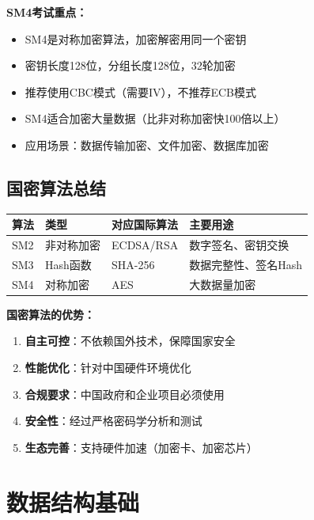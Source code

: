 ﻿\documentclass[12pt,a4paper]{article}
\begin{document}
\begin{keypointbox}
\textbf{SM4考试重点：}
\begin{itemize}
\item SM4是对称加密算法，加密解密用同一个密钥
\item 密钥长度128位，分组长度128位，32轮加密
\item 推荐使用CBC模式（需要IV），不推荐ECB模式
\item SM4适合加密大量数据（比非对称加密快100倍以上）
\item 应用场景：数据传输加密、文件加密、数据库加密
\end{itemize}
\end{keypointbox}

\subsection{国密算法总结}

\begin{center}
\begin{tabular}{|l|l|l|l|}
\hline
\textbf{算法} & \textbf{类型} & \textbf{对应国际算法} & \textbf{主要用途} \\
\hline
SM2 & 非对称加密 & ECDSA/RSA & 数字签名、密钥交换 \\
\hline
SM3 & Hash函数 & SHA-256 & 数据完整性、签名Hash \\
\hline
SM4 & 对称加密 & AES & 大数据量加密 \\
\hline
\end{tabular}
\end{center}

\begin{theorybox}
\textbf{国密算法的优势：}
\begin{enumerate}
\item \textbf{自主可控}：不依赖国外技术，保障国家安全
\item \textbf{性能优化}：针对中国硬件环境优化
\item \textbf{合规要求}：中国政府和企业项目必须使用
\item \textbf{安全性}：经过严格密码学分析和测试
\item \textbf{生态完善}：支持硬件加速（加密卡、加密芯片）
\end{enumerate}
\end{theorybox}

\section{数据结构基础}
\end{document}
